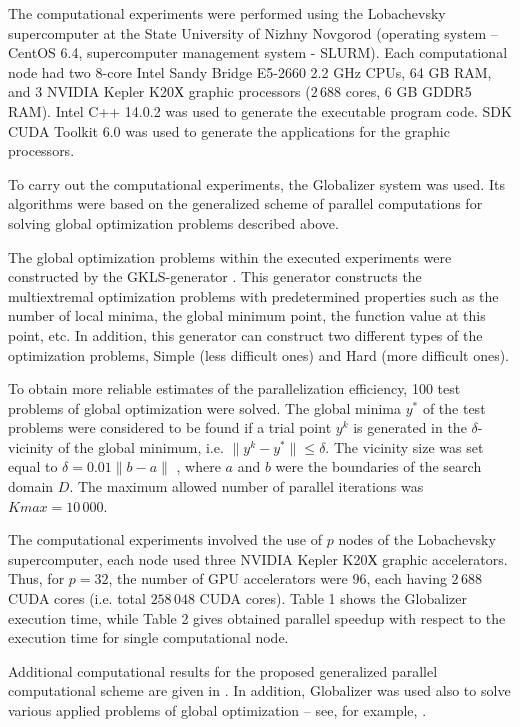 \documentclass[
11pt,%
tightenlines,%
twoside,%
onecolumn,%
nofloats,%
nobibnotes,%
nofootinbib,%
superscriptaddress,%
noshowpacs,%
centertags]%
{revtex4}
\begin{document}
The computational experiments were performed using the Lobachevsky supercomputer at the State University of Nizhny Novgorod (operating system -- CentOS 6.4, supercomputer management system - SLURM). Each computational node had two 8-core Intel Sandy Bridge E5-2660 2.2 GHz CPUs, 64 GB RAM, and 3 NVIDIA Kepler K20Х graphic processors ($2\,688$ cores, 6 GB GDDR5 RAM). Intel C++ 14.0.2 was used to generate the executable program code. SDK CUDA Toolkit 6.0 was used to generate the applications for the graphic processors.

To carry out the computational experiments, the Globalizer system \cite{Sysoyev} was used. Its algorithms were based on the generalized scheme of parallel computations for solving global optimization problems described above.
 
The global optimization problems within the executed experiments were constructed by the GKLS-generator \cite{Gaviano}. This generator constructs the multiextremal optimization problems with predetermined properties such as the number of local minima, the global minimum point, the function value at this point, etc. In addition, this generator can construct two different types of the optimization problems, Simple (less difficult ones) and Hard (more difficult ones).

To obtain more reliable estimates of the parallelization efficiency, 100 test problems of global optimization were solved. The global minima $y^\ast$ of the test problems were considered to be found if a trial point $y^k$ is generated in the $\delta$-vicinity of the global minimum, i.e. $\| y^k - y^ \ast \| \leq \delta$. The vicinity size was set equal to $\delta = 0.01 \|b - a \|$ , where $a$ and $b$ were the boundaries of the search domain $D$. The maximum allowed number of parallel iterations was $Kmax = 10\,000$.

The computational experiments involved the use of $p$ nodes of the Lobachevsky supercomputer, each node used three NVIDIA Kepler K20Х graphic accelerators. Thus, for $p = 32$, the number of GPU accelerators were 96, each having $2\,688$ CUDA cores (i.e. total $258\,048$ CUDA cores). Table 1 shows the Globalizer execution time, while Table 2 gives obtained parallel speedup with respect to the execution time for single computational node.

Additional computational results for the proposed generalized parallel computational scheme are given in \cite{Gergel1, Gergel2, Barkalov, Gergel3, Gergel4}. In addition, Globalizer was used also to solve various applied problems of global optimization -- see, for example, \cite{Modorskii, Gergel6}.
\end{document}
